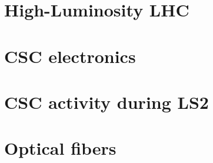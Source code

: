 \section{High-Luminosity LHC} \label{sec:HLLHC}


\section{CSC electronics} \label{sec:CSCElectronics}


\section{CSC activity during LS2} \label{sec:CSCActivityDuringLS2}


\section{Optical fibers} \label{sec:OpticalFibers}
